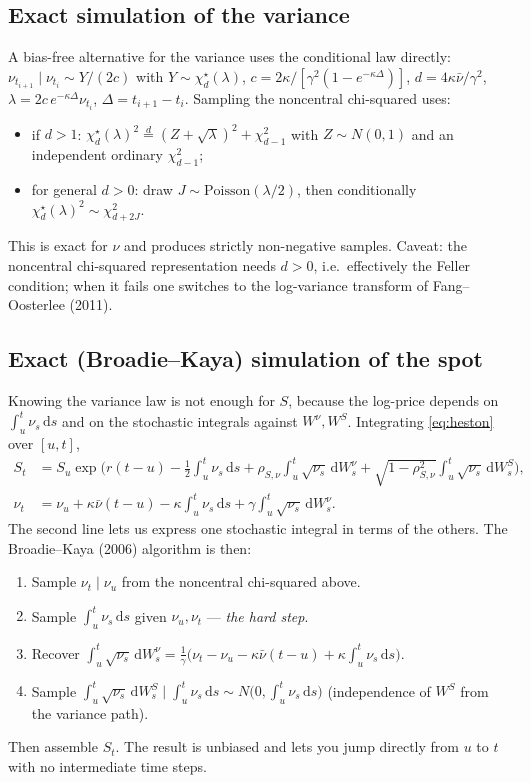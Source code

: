 \documentclass[11pt]{article}
\newcommand{\dd}{\,\mathrm{d}}
\begin{document}
\subsection{Exact simulation of the variance}

A bias-free alternative for the variance uses the conditional law directly:
$\nu_{t_{i+1}}\mid\nu_{t_i}\sim Y/(2c)$ with $Y\sim\chi^\star_d(\lambda)$,
$c=2\kappa/[\gamma^2(1-e^{-\kappa\Delta})]$, $d=4\kappa\bar\nu/\gamma^2$,
$\lambda=2c\,e^{-\kappa\Delta}\nu_{t_i}$, $\Delta=t_{i+1}-t_i$. Sampling the noncentral
chi-squared uses:
\begin{itemize}[noitemsep]
\item if $d>1$: $\chi^\star_d(\lambda)^2 \stackrel{d}{=} (Z+\sqrt\lambda)^2 + \chi^2_{d-1}$
with $Z\sim N(0,1)$ and an independent ordinary $\chi^2_{d-1}$;
\item for general $d>0$: draw $J\sim\mathrm{Poisson}(\lambda/2)$, then conditionally
$\chi^\star_d(\lambda)^2\sim\chi^2_{d+2J}$.
\end{itemize}
This is exact for $\nu$ and produces strictly non-negative samples. Caveat: the noncentral
chi-squared representation needs $d>0$, i.e.\ effectively the Feller condition; when it
fails one switches to the log-variance transform of Fang--Oosterlee (2011).

\subsection{Exact (Broadie--Kaya) simulation of the spot}

Knowing the variance law is not enough for $S$, because the log-price depends on
$\int_u^t\nu_s\dd s$ and on the stochastic integrals against $W^\nu,W^S$. Integrating
\eqref{eq:heston} over $[u,t]$,
\begin{align}
S_t &= S_u \exp\!\Big(r(t-u) - \tfrac12\!\int_u^t\!\nu_s\dd s
+ \rho_{S,\nu}\!\int_u^t\!\sqrt{\nu_s}\dd W^\nu_s
+ \sqrt{1-\rho_{S,\nu}^2}\!\int_u^t\!\sqrt{\nu_s}\dd W^S_s\Big),\\
\nu_t &= \nu_u + \kappa\bar\nu(t-u) - \kappa\!\int_u^t\!\nu_s\dd s
+ \gamma\!\int_u^t\!\sqrt{\nu_s}\dd W^\nu_s.
\end{align}
The second line lets us express one stochastic integral in terms of the others. The
Broadie--Kaya (2006) algorithm is then:
\begin{enumerate}[label=\textbf{Step \arabic*.},leftmargin=*]
\item Sample $\nu_t\mid\nu_u$ from the noncentral chi-squared above.
\item Sample $\int_u^t\nu_s\dd s$ given $\nu_u,\nu_t$ --- \emph{the hard step}.
\item Recover $\int_u^t\sqrt{\nu_s}\dd W^\nu_s
= \tfrac1\gamma\big(\nu_t-\nu_u-\kappa\bar\nu(t-u)+\kappa\int_u^t\nu_s\dd s\big)$.
\item Sample $\int_u^t\sqrt{\nu_s}\dd W^S_s \mid \int_u^t\nu_s\dd s
\sim N\!\big(0,\int_u^t\nu_s\dd s\big)$ (independence of $W^S$ from the variance path).
\end{enumerate}
Then assemble $S_t$. The result is unbiased and lets you jump directly from $u$ to $t$ with
no intermediate time steps.
\end{document}
